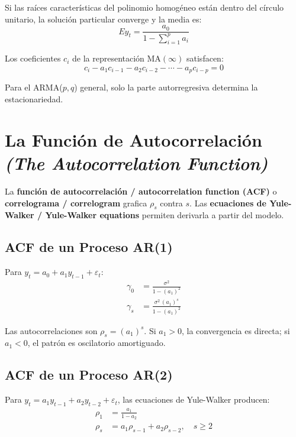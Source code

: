 \documentclass[12pt]{article}
\begin{document}
Si las ra\'ices caracter\'isticas del polinomio homog\'eneo est\'an dentro del c\'irculo unitario, la soluci\'on particular converge y la media es:
\begin{equation}
E y_t = \frac{a_0}{1-\sum_{i=1}^p a_i}
\end{equation}

Los coeficientes $c_i$ de la representaci\'on MA$(\infty)$ satisfacen:
\begin{equation}
c_i - a_1 c_{i-1} - a_2 c_{i-2} - \cdots - a_p c_{i-p} = 0
\end{equation}

Para el ARMA($p,q$) general, solo la parte autorregresiva determina la estacionariedad.

\section{La Funci\'on de Autocorrelaci\'on \textit{(The Autocorrelation Function)}}

La \textbf{funci\'on de autocorrelaci\'on / autocorrelation function (ACF)} o \textbf{correlograma / correlogram} grafica $\rho_s$ contra $s$. Las \textbf{ecuaciones de Yule-Walker / Yule-Walker equations} permiten derivarla a partir del modelo.

\subsection{ACF de un Proceso AR(1)}

Para $y_t = a_0 + a_1 y_{t-1} + \varepsilon_t$:
\begin{align}
\gamma_0 &= \frac{\sigma^2}{1-(a_1)^2}\\
\gamma_s &= \frac{\sigma^2\,(a_1)^s}{1-(a_1)^2}
\end{align}

Las autocorrelaciones son $\rho_s = (a_1)^s$. Si $a_1 > 0$, la convergencia es directa; si $a_1 < 0$, el patr\'on es oscilatorio amortiguado.

\subsection{ACF de un Proceso AR(2)}

Para $y_t = a_1 y_{t-1} + a_2 y_{t-2} + \varepsilon_t$, las ecuaciones de Yule-Walker producen:
\begin{align}
\rho_1 &= \frac{a_1}{1-a_2}\\
\rho_s &= a_1\rho_{s-1} + a_2\rho_{s-2}, \quad s \ge 2
\end{align}
\end{document}
